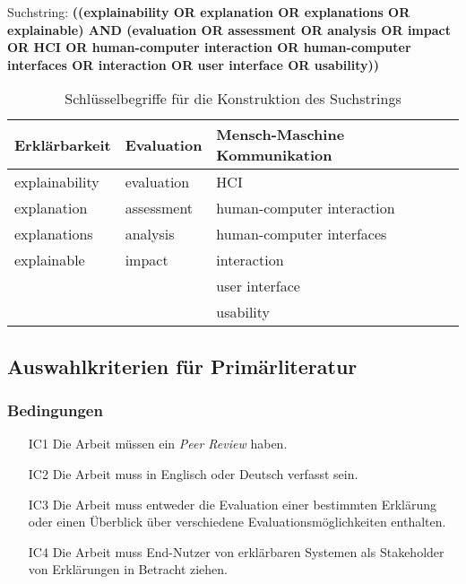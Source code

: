\smallskip

\noindent Suchstring: \textbf{((explainability OR explanation OR explanations OR explainable) AND (evaluation OR assessment OR analysis OR impact OR HCI OR \glqq human-computer interaction\grqq{} OR \glqq human-computer interfaces \grqq{} OR interaction OR \glqq user interface\grqq{} OR usability))}

\begin{table}[htb!]
    \begin{tabular}{p{}p{}p{}}
        \hline
        Erklärbarkeit  & Evaluation & Mensch-Maschine Kommunikation             \\
        \toprule
        explainability          & evaluation    & HCI\\
        explanation             & assessment    & human-computer interaction    \\
        explanations            & analysis      & human-computer interfaces     \\
        explainable             & impact        & interaction                   \\
                                &               & user interface                \\
                                &               & usability                     \\              
        \toprule
    \end{tabular}
\caption{Schlüsselbegriffe für die Konstruktion des Suchstrings}
\label{tab:search_terms}
\end{table}





\subsection{Auswahlkriterien für Primärliteratur}

\subsubsection{Bedingungen}

\begin{enumerate}
    \item[IC1] Die Arbeit müssen ein \textit{Peer Review} haben.
    \item[IC2] Die Arbeit muss in Englisch oder Deutsch verfasst sein.
    \item[IC3] Die Arbeit muss entweder die Evaluation einer bestimmten Erklärung oder einen Überblick über verschiedene Evaluationsmöglichkeiten enthalten.
    \item[IC4] Die Arbeit muss End-Nutzer von erklärbaren Systemen als Stakeholder von Erklärungen in Betracht ziehen.
\end{enumerate}

